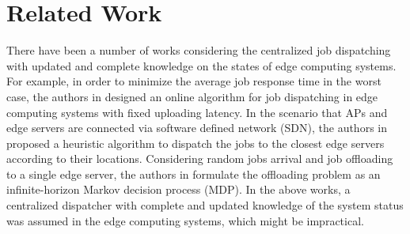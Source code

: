 \section{Related Work}
\label{sec:review}

There have been a number of works considering the centralized job dispatching with updated and complete knowledge on the states of edge computing systems.
For example, in order to minimize the average job response time in the worst case, the authors in \cite{tan-online} designed an online algorithm for job dispatching in edge computing systems with fixed uploading latency.
In the scenario that APs and edge servers are connected via software defined network (SDN), the authors in \cite{IOTJ18-FanQ} proposed a heuristic algorithm to dispatch the jobs to the closest edge servers according to their locations.
Considering random jobs arrival and job offloading to a single edge server, the authors in \cite{mdp-globecom,mdp-tvt} formulate the offloading problem as an infinite-horizon Markov decision process (MDP).
In the above works, a centralized dispatcher with complete and updated knowledge of the system status was assumed in the edge computing systems, which might be impractical.


